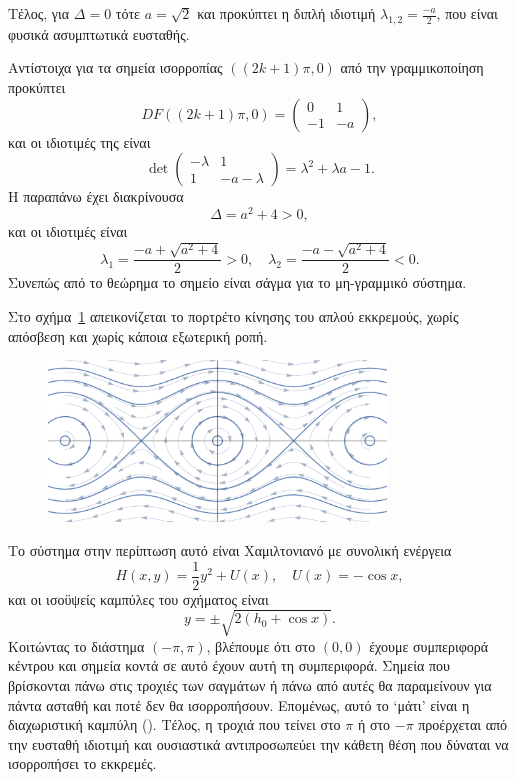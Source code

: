 \begin{solution}
    Τέλος, για \( \Delta = 0 \) τότε \( a = \sqrt{2} \) και προκύπτει η διπλή
    ιδιοτιμή \( \lambda_{1,2} = \frac{-a}{2} \), που είναι φυσικά ασυμπτωτικά
    ευσταθής.

    Αντίστοιχα για τα σημεία ισορροπίας \( ((2k + 1)\pi, 0) \) από την γραμμικοποίηση προκύπτει
    \[
        DF((2k + 1)\pi, 0) = \begin{pmatrix}
            0 & 1 \\
            -1 & -a
        \end{pmatrix},
    \]
    και οι ιδιοτιμές της είναι
    \[
        \det
        \begin{pmatrix}
            -\lambda & 1 \\
            1 & -a - \lambda
        \end{pmatrix}
        = \lambda^2 + \lambda a - 1.
    \]
    Η παραπάνω έχει διακρίνουσα
    \[
        \Delta = a^2 + 4 > 0,
    \]
    και οι ιδιοτιμές είναι
    \[
        \lambda_1 = \frac{-a + \sqrt{a^2 + 4}}{2} > 0, \quad
        \lambda_2 = \frac{-a - \sqrt{a^2 + 4}}{2} < 0.
    \]
    Συνεπώς από το θεώρημα  το σημείο είναι
    σάγμα για το μη-γραμμικό σύστημα.

    Στο σχήμα~\ref{fig:ex4_undampedPendComb} απεικονίζεται το πορτρέτο κίνησης
    του απλού εκκρεμούς, χωρίς απόσβεση και χωρίς κάποια εξωτερική ροπή.
    \begin{figure}[h]
        \centering
        \includegraphics[width=0.8\textwidth]{figures/ex4_undampedPendComb.pdf}
        \caption{}
        \label{fig:ex4_undampedPendComb}
    \end{figure}
    Το σύστημα στην περίπτωση αυτό είναι Χαμιλτονιανό με συνολική ενέργεια
    \[
        H(x, y) = \frac{1}{2}y^2 + U(x),\quad U(x) = - \cos{x},
    \]
    και οι ισοϋψείς καμπύλες του σχήματος είναι
    \[
        y = \pm \sqrt{2(h_0 + \cos{x})}.
    \]
    Κοιτώντας το διάστημα \( (-\pi, \pi) \), βλέπουμε ότι στο \( (0, 0) \) έχουμε
    συμπεριφορά κέντρου και σημεία κοντά σε αυτό έχουν αυτή τη συμπεριφορά. Σημεία
    που βρίσκονται πάνω στις τροχιές των σαγμάτων ή πάνω από αυτές θα παραμείνουν
    για πάντα ασταθή και ποτέ δεν θα ισορροπήσουν. Επομένως, αυτό το
    \enquote*{μάτι} είναι η διαχωριστική καμπύλη (). Τέλος, η
    τροχιά που τείνει στο \( \pi \) ή στο \( -\pi \) προέρχεται από την ευσταθή
    ιδιοτιμή και ουσιαστικά αντιπροσωπεύει την κάθετη θέση που δύναται να
    ισορροπήσει το εκκρεμές.


\end{solution}
